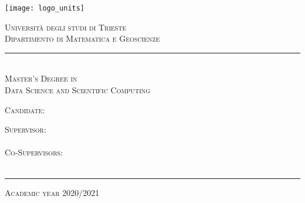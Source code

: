 \graphicspath{{frontmatter/figures/}}
\begin{titlepage}
	
	\begin{center}
	
		\texttt{[image: logo\_units]}\\[0.4cm]
			
		\vspace{0.8cm}
		
		{ \huge \scshape Università degli studi di Trieste }\\[0.25cm]
		{ \Large \scshape Dipartimento di Matematica e Geoscienze }
		\rule{\textwidth}{0.4pt}\\[1cm]

 		{ \Large \scshape Master's Degree in\\Data Science and Scientific Computing }\\[2cm]
		
		
		{ \huge \bfseries \THtitle }
		
		\vfill
				
		\begin{minipage}[t]{0.45\textwidth}
			\begin{flushleft} %
				{ \large \scshape Candidate: }\\[0.25cm]
				{ \THauthor }
			\end{flushleft}
		\end{minipage}
		\begin{minipage}[t]{0.45\textwidth}
			\begin{flushright} %
				{ \large \scshape Supervisor: } \\[0.25cm]
				{ \THsupervisor } \\[0.30cm]
				{ \large \scshape Co-Supervisors: } \\[0.25cm]
				{ \THcosupervisor }\\[0.10cm]
				{ \THextracosupervisor }
			\end{flushright}
		\end{minipage}
		
		\vspace{2cm}
		
		\rule{\textwidth}{0.4pt}
		{\large \scshape Academic year 2020/2021 }
		
	\end{center}
	
	\restoregeometry
\end{titlepage}
